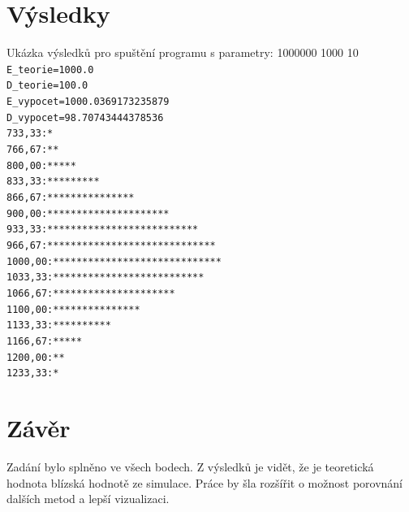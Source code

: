 \documentclass{article}
\begin{document}
\section{Výsledky}
Ukázka výsledků pro spuštění programu s parametry: 1000000 1000 10\newline
\newline
\texttt
{
E\_teorie=1000.0\\
D\_teorie=100.0\\
E\_vypocet=1000.0369173235879\\
D\_vypocet=98.70743444378536\\
733,33:*\\
766,67:**\\
800,00:*****\\
833,33:*********\\
866,67:***************\\
900,00:*********************\\
933,33:**************************\\
966,67:*****************************\\
1000,00:*****************************\\
1033,33:**************************\\
1066,67:*********************\\
1100,00:***************\\
1133,33:**********\\
1166,67:*****\\
1200,00:**\\
1233,33:*\\
}



\section{Závěr} %

Zadání bylo splněno ve všech bodech. Z výsledků je vidět, že je teoretická hodnota blízská hodnotě ze simulace. Práce by šla rozšířit o možnost porovnání dalších metod a lepší vizualizaci.



\end{document}
